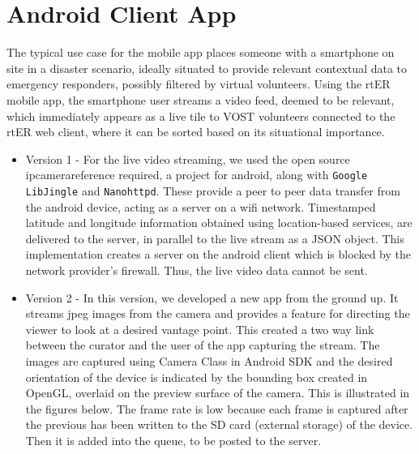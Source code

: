 \section{Android Client App}
The typical use case for the mobile app places someone with a smartphone on site in a disaster scenario, ideally situated to provide relevant contextual data to emergency responders, possibly filtered by virtual volunteers. Using the rtER mobile app, the smartphone user streams a video feed, deemed to be relevant, which immediately appears as a live tile to VOST volunteers connected to the rtER web client, where it can be sorted based on its situational importance.

	\begin{itemize}
		\item Version 1 -  For the live video streaming, we used the open source ipcamera{reference required}, a project for android, along with \texttt{Google LibJingle} and \texttt{Nanohttpd}. These provide a peer to peer data transfer from the android device, acting as a server on a wifi network. Timestamped latitude and longitude information obtained using location-based services, are delivered to the server, in parallel to the live stream as a JSON object. This implementation creates a server on the android client which is blocked by the network provider’s firewall. Thus, the live video data cannot be sent.
		\item Version 2 - In this version, we developed a new app from the ground up. It streams jpeg images from the camera and provides a feature for directing the viewer to look at a desired vantage point. This created a two way link between the curator and the user of the app capturing the stream. The images are captured using Camera Class in Android SDK and the desired orientation of the device is indicated by the bounding box created in OpenGL, overlaid on the preview surface of the camera. This is illustrated in the figures below. The frame rate is low because each frame is captured after the previous has been written to the SD card (external storage) of the device. Then it is added into the queue, to be posted to the server.
\begin{figure}
\begin{center}

\end{center}
\end{figure}
\end{itemize}
